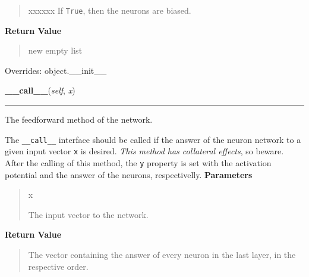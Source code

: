 \begin{boxedminipage}{\funcwidth}
\begin{quote}
\begin{Ventry}{xxxxxx}
If \texttt{True}, then the neurons are biased.
        \end{Ventry}

      \end{quote}

      \textbf{Return Value}
    \vspace{-1ex}

      \begin{quote}

new empty list
      \end{quote}

      Overrides: object.\_\_init\_\_

    \end{boxedminipage}

    \label{peach:nn:nnet:FeedForward:__call__}

    \vspace{0.5ex}

\hspace{.8\funcindent}\begin{boxedminipage}{\funcwidth}

    \raggedright \textbf{\_\_call\_\_}(\textit{self}, \textit{x})

    \vspace{-1.5ex}

    \rule{\textwidth}{0.5\fboxrule}
\setlength{\parskip}{2ex}

The feedforward method of the network.

The \texttt{\_\_call\_\_} interface should be called if the answer of the neuron
network to a given input vector \texttt{x} is desired. \emph{This method has
collateral effects}, so beware. After the calling of this method, the
\texttt{y} property is set with the activation potential and the answer of
the neurons, respectivelly.
\setlength{\parskip}{1ex}
      \textbf{Parameters}
      \vspace{-1ex}

      \begin{quote}
        \begin{Ventry}{x}

          \item[x]


The input vector to the network.
        \end{Ventry}

      \end{quote}

      \textbf{Return Value}
    \vspace{-1ex}

      \begin{quote}

The vector containing the answer of every neuron in the last layer, in
the respective order.
      \end{quote}

    \end{boxedminipage}

